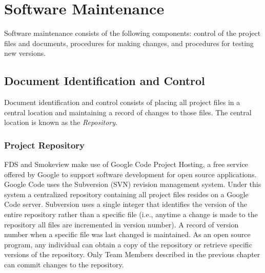 \documentclass[11pt]{book}
\begin{document}
\chapter{Software Maintenance}

Software maintenance consists of the following components: control of the project files and documents, procedures for making changes, and procedures for testing new versions.


\section{Document Identification and Control}

Document identification and control consists of placing all project files in a central location and maintaining a record of changes to those files.
The central location is known as the {\em Repository}.


\subsection{Project Repository}

FDS and Smokeview make use of Google Code Project Hosting, a free service offered by Google to support software development for open source applications.  Google Code uses the Subversion (SVN) revision management system. Under this system a centralized repository containing all project files resides on a Google Code server. Subversion uses a single integer that identifies the version of the entire repository rather than a specific file (i.e., anytime a change is made to the repository all files are incremented in version number).  A record of version number when a specific file was last changed is maintained. As an open source program, any individual can obtain a copy of the repository or retrieve specific versions of the repository.  Only Team Members described in the previous chapter can commit changes to the repository.
\end{document}
